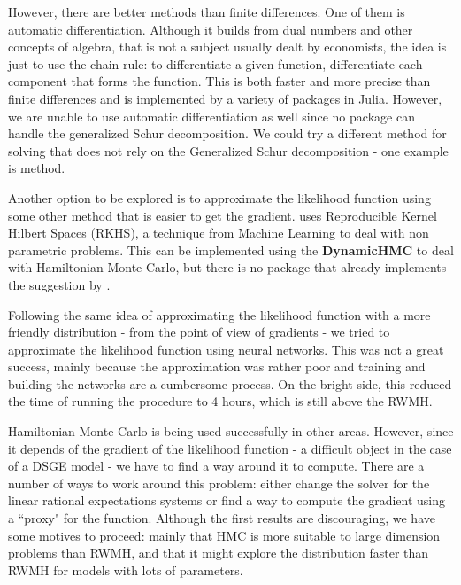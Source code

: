 \documentclass[12pt,a4paper]{article}
\begin{document}
However, there are better methods than finite differences. One of them is automatic differentiation. Although it builds from dual numbers and other concepts of algebra, that is not a subject usually dealt by economists, the idea is just to use the chain rule: to differentiate a given function, differentiate each component that forms the function. This is both faster and more precise than finite differences and is implemented by a variety of packages in Julia. However, we are unable to use automatic differentiation as well since no package can handle the generalized Schur decomposition. We could try a different method for solving that does not rely on the Generalized Schur decomposition - one example is \cite{anderson1985} method. 

Another option to be explored is to approximate the likelihood function using some other method that is easier to get the gradient. \cite{Strathmann2015a} uses Reproducible Kernel Hilbert Spaces (RKHS), a technique from Machine Learning to deal with non parametric problems. This can be implemented using the \textbf{DynamicHMC} to deal with Hamiltonian Monte Carlo, but there is no package that already implements the suggestion by \cite{Strathmann2015a}. 

Following the same idea of approximating the likelihood function with a more friendly distribution - from the point of view of gradients - we tried to approximate the likelihood function using neural networks. This was not a great success, mainly because the approximation was rather poor and training and building the networks are a cumbersome process. On the bright side, this reduced the time of running the procedure to 4 hours, which is still above the RWMH.

Hamiltonian Monte Carlo is being used successfully in other areas. However, since it depends of the gradient of the likelihood function  - a difficult object in the case of a DSGE model - we have to find a way around it to compute. There are a number of ways to work around this problem: either change the solver for the linear rational expectations systems or find a way to compute the gradient using a ``proxy" for the function. Although the first results are discouraging, we have some motives to proceed: mainly that HMC is more suitable to large dimension problems than RWMH, and that it might explore the distribution faster than RWMH for models with lots of parameters.   



\end{document}
